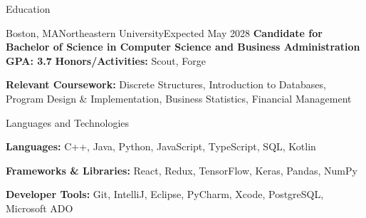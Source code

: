 \documentclass[]{mcdowellcv}
\begin{document}
	\makeheader
	\begin{cvsection}{Education}
		\begin{cvsubsection}{Boston, MA}{Northeastern University}{Expected May 2028}
			\textbf{Candidate for Bachelor of Science in Computer Science and Business Administration \hfill{GPA: 3.7}}
			\textbf{Honors/Activities:} Scout, Forge
			\vspace{-2mm}
			
			\textbf{Relevant Coursework:} Discrete Structures, Introduction to Databases, Program Design \& Implementation, Business Statistics, Financial Management
		\end{cvsubsection}
	\end{cvsection}
		\begin{cvsection}{Languages and Technologies}
		\begin{cvsubsection}{}{}{}	

\textbf{Languages:} C++, Java, Python, JavaScript, TypeScript, SQL, Kotlin
\vspace{-2mm}

\textbf{Frameworks \& Libraries:} React, Redux, TensorFlow, Keras, Pandas, NumPy
\vspace{-2mm}

\textbf{Developer Tools:} Git, IntelliJ, Eclipse, PyCharm, Xcode, PostgreSQL, Microsoft ADO
		\end{cvsubsection}
	\end{cvsection}
\end{document}
